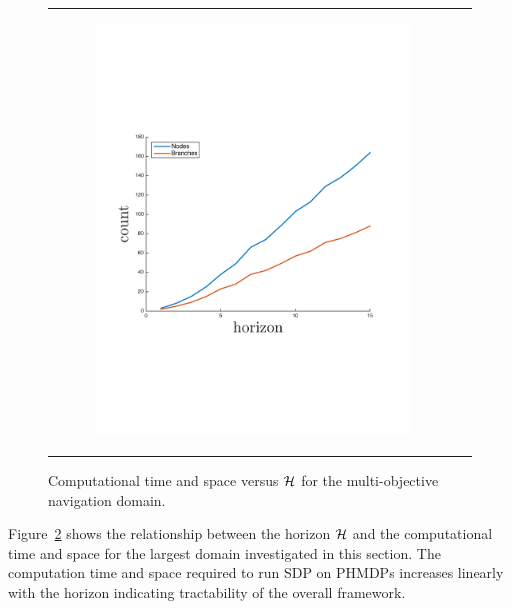 \begin{figure}[ht]
\begin{tabular}{cc}
            \begin{subfigure}[b]{0.24\textwidth}\centering \includegraphics[width=\textwidth]{images/space_plot_new}
                \label{fig:space_complexity}\end{subfigure}
            \\
        \end{tabular}
        \caption{Computational time and space versus {\footnotesize $ \mathcal{H} $} for the multi-objective navigation domain.}
        \label{fig:time_space_complexity}    
        \vspace{-3mm}
    \end{figure}

Figure~\ref{fig:time_space_complexity} shows the relationship between the horizon {\footnotesize $ \mathcal{H} $} and the computational time and space for the largest domain investigated in this section. 
The computation time and space required to run SDP on PHMDPs increases linearly with the horizon indicating tractability of the overall framework.